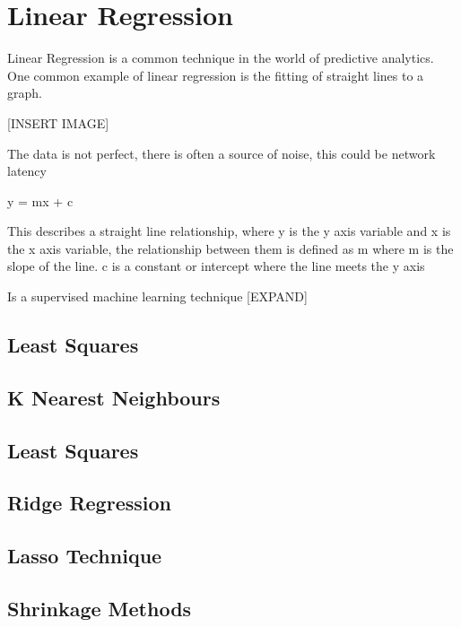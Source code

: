 \section{Linear Regression}

Linear Regression is a common technique in the world of predictive analytics. One common example of linear regression is the fitting of straight lines to a graph. 

[INSERT IMAGE]

The data is not perfect, there is often a source of noise, this could be network latency

y = mx + c

This describes a straight line relationship, where y is the y axis variable and x is the x axis variable, the relationship between them is defined as m where m is the slope of the line. c is a constant or intercept where the line meets the y axis

Is a supervised machine learning technique [EXPAND]

\subsection*{Least Squares}
\subsection*{K Nearest Neighbours}
\subsection*{Least Squares}
\subsection*{Ridge Regression}
\subsection*{Lasso Technique}

\subsection*{Shrinkage Methods}